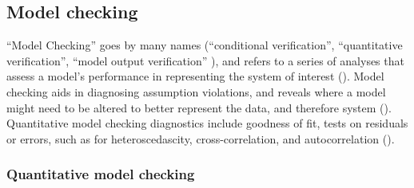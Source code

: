 \documentclass[
]{article}
\begin{document}
\subsection{Model checking}\label{model-checking}

\begin{tcolorbox}[enhanced jigsaw, opacitybacktitle=0.6, bottomrule=.15mm, leftrule=.75mm, rightrule=.15mm, colbacktitle=quarto-callout-note-color!10!white, toprule=.15mm, titlerule=0mm, left=2mm, colframe=quarto-callout-note-color-frame, breakable, title=\textcolor{quarto-callout-note-color}{\faInfo}\hspace{0.5em}{Rationale \& Explanation}, opacityback=0, coltitle=black, bottomtitle=1mm, colback=white, toptitle=1mm, arc=.35mm]

``Model Checking'' goes by many names (``conditional verification'',
``quantitative verification'', ``model output verification'' ), and
refers to a series of analyses that assess a model's performance in
representing the system of interest (). Model checking aids in diagnosing assumption violations,
and reveals where a model might need to be altered to better represent
the data, and therefore system (). Quantitative model checking diagnostics include goodness of fit,
tests on residuals or errors, such as for heteroscedascity,
cross-correlation, and autocorrelation
().

\end{tcolorbox}

\subsubsection{Quantitative model
checking}\label{quantitative-model-checking}
\end{document}
